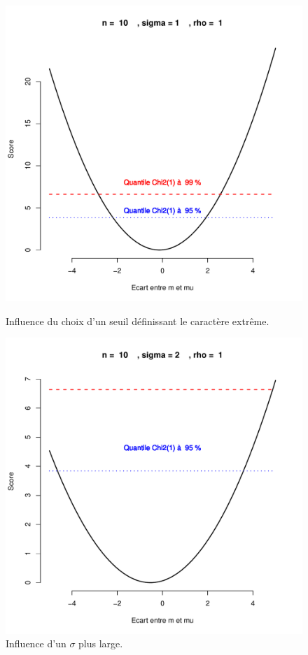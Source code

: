 \clearpage

\begin{figure}[hbtp]
\centering
\begin{minipage}[b]{0.5\linewidth}
\includegraphics[scale=0.4]{figures/prior/figure1.pdf}
\caption{Influence du choix d'un seuil définissant le caractère extrême.}
\label{toto1}
\end{minipage}\hfill 
\begin{minipage}[b]{0.5\linewidth}
\includegraphics[scale=0.4]{figures/prior/figure2.pdf}
\caption{Influence d'un $\sigma$ plus large.}
\label{toto2}
\end{minipage}


\end{figure}
